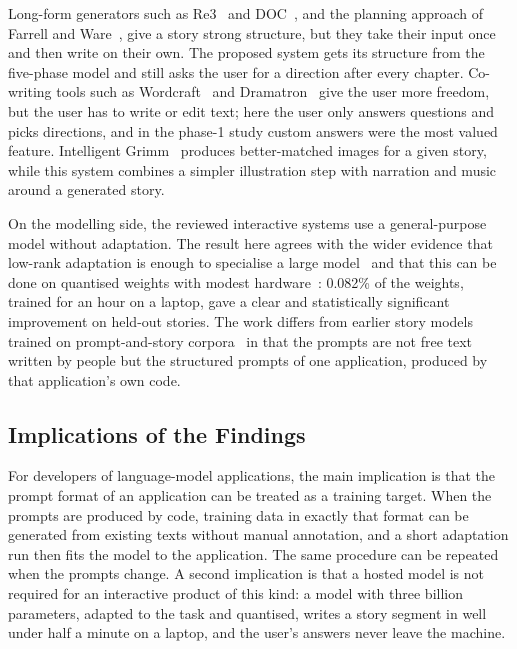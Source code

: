 Long-form generators such as Re3~\cite{yang2022re3} and DOC~\cite{yang2023doc}, and the planning approach of Farrell and Ware~\cite{farrell2024narrative}, give a story strong structure, but they take their input once and then write on their own. The proposed system gets its structure from the five-phase model and still asks the user for a direction after every chapter. Co-writing tools such as Wordcraft~\cite{yuan2022wordcraft} and Dramatron~\cite{mirowski2023dramatron} give the user more freedom, but the user has to write or edit text; here the user only answers questions and picks directions, and in the phase-1 study custom answers were the most valued feature. Intelligent Grimm~\cite{liu2024grimm} produces better-matched images for a given story, while this system combines a simpler illustration step with narration and music around a generated story.

On the modelling side, the reviewed interactive systems use a general-purpose model without adaptation. The result here agrees with the wider evidence that low-rank adaptation is enough to specialise a large model~\cite{hu2022lora} and that this can be done on quantised weights with modest hardware~\cite{dettmers2023qlora}: 0.082\% of the weights, trained for an hour on a laptop, gave a clear and statistically significant improvement on held-out stories. The work differs from earlier story models trained on prompt-and-story corpora~\cite{fan2018hierarchical} in that the prompts are not free text written by people but the structured prompts of one application, produced by that application's own code.

\subsection{Implications of the Findings}

For developers of language-model applications, the main implication is that the prompt format of an application can be treated as a training target. When the prompts are produced by code, training data in exactly that format can be generated from existing texts without manual annotation, and a short adaptation run then fits the model to the application. The same procedure can be repeated when the prompts change. A second implication is that a hosted model is not required for an interactive product of this kind: a model with three billion parameters, adapted to the task and quantised, writes a story segment in well under half a minute on a laptop, and the user's answers never leave the machine.


